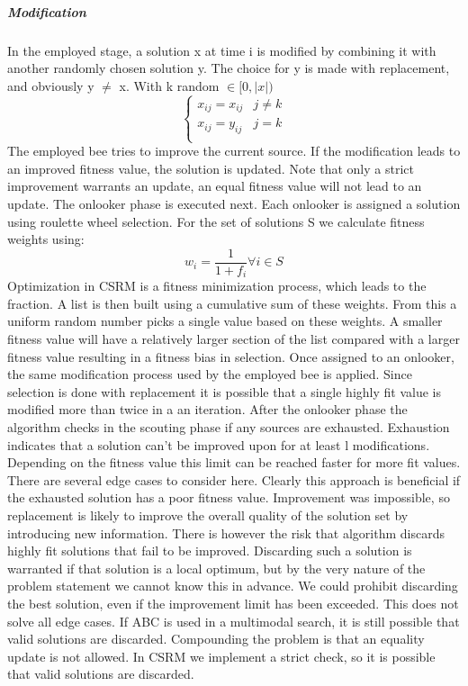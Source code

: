 \subparagraph{Modification}
In the employed stage, a solution x at time i is modified by combining it with another randomly chosen solution y. The choice for y is made with replacement, and obviously y $\neq$ x.
With k random $\in [0, \vert x \vert)$
\[   \left\{
\begin{array}{ll}
      x_{ij} = x_{ij} & j \neq k \\
      x_{ij} = y_{ij} & j = k \\
\end{array} 
\right.
\]
The employed bee tries to improve the current source. If the modification leads to an improved fitness value, the solution is updated. Note that only a strict improvement warrants an update, an equal fitness value will not lead to an update. 
The onlooker phase is executed next. Each onlooker is assigned a solution using roulette wheel selection.
For the set of solutions S we calculate fitness weights using:
\[
w_i = \frac{1}{1 + f_i} \forall i \in S 
\]
Optimization in CSRM is a fitness minimization process, which leads to the fraction. A list is then built using a cumulative sum of these weights. From this a uniform random number picks a single value based on these weights. A smaller fitness value will have a relatively larger section of the list compared with a larger fitness value resulting in a fitness bias in selection. 
Once assigned to an onlooker, the same modification process used by the employed bee is applied. Since selection is done with replacement it is possible that a single highly fit value is modified more than twice in a an iteration. 
After the onlooker phase the algorithm checks in the scouting phase if any sources are exhausted. Exhaustion indicates that a solution can't be improved upon for at least l modifications. Depending on the fitness value this limit can be reached faster for more fit values. There are several edge cases to consider here. Clearly this approach is beneficial if the exhausted solution has a poor fitness value. Improvement was impossible, so replacement is likely to improve the overall quality of the solution set by introducing new information. There is however the risk that algorithm discards highly fit solutions that fail to be improved. Discarding such a solution is warranted if that solution is a local optimum, but by the very nature of the problem statement we cannot know this in advance. We could prohibit discarding the best solution, even if the improvement limit has been exceeded. This does not solve all edge cases. If ABC is used in a multimodal search, it is still possible that valid solutions are discarded. Compounding the problem is that an equality update is not allowed. In CSRM we implement a strict check, so it is possible that valid solutions are discarded. 
